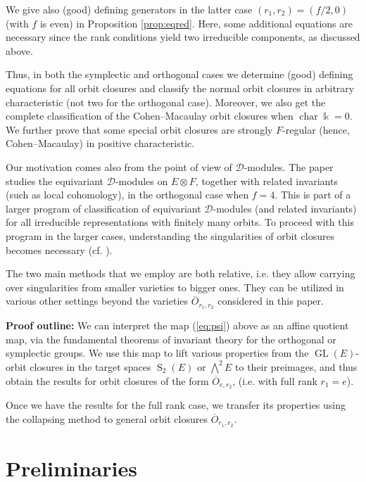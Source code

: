 \documentclass[11pt]{amsart}
\numberwithin{equation}{section}
\theoremstyle{definition}
\DeclareMathOperator{\GL}{GL}
\DeclareMathOperator{\cha}{char}
\newcommand{\op}{\operatorname}
\newcommand{\oo}{\otimes}
\newcommand{\ol}{\overline}
\newcommand{\kk}{\Bbbk}
\begin{document}
We give also (good) defining generators in the latter case $(r_1,r_2) = (f/2, 0)$ (with $f$ is even) in Proposition \ref{prop:eqred}. Here, some additional equations are necessary since the rank conditions yield two irreducible components, as discussed above.

\medskip

Thus, in both the symplectic and orthogonal cases we determine (good) defining equations for all orbit closures and classify the normal orbit closures in arbitrary characteristic (not two for the orthogonal case). Moreover, we also get the complete classification of the Cohen--Macaulay orbit closures when $\cha \kk = 0$. We further prove that some special orbit closures are strongly $F$-regular (hence, Cohen--Macaulay) in positive characteristic.

\smallskip

Our motivation comes also from the point of view of $\mathcal{D}$-modules. The paper \cite{lorper} studies the equivariant $\mathcal{D}$-modules on $E\oo F$, together with related invariants (such as local cohomology), in the orthogonal case when $f=4$. This is part of a larger program of classification of equivariant $\mathcal{D}$-modules (and related invariants) for all irreducible representations with finitely many orbits. To proceed with this program in the larger cases, understanding the singularities of orbit closures becomes necessary (cf. \cite[Section 6]{lorper}).


\medskip

The two main methods that we employ are both relative, i.e. they allow carrying over singularities from smaller varieties to bigger ones. They can be utilized in various other settings beyond the varieties $\ol{O}_{r_1,r_2}$ considered in this paper.

\smallskip

\textbf{Proof outline:} 
We can interpret the map (\ref{eq:psi}) above as an affine quotient map, via the fundamental theorems of invariant theory for the orthogonal or symplectic groups. We use this map to lift various properties from the $\GL(E)$-orbit closures in the target spaces $\op{S}_2(E)$ or $\bigwedge^2 E$ to their preimages, and thus obtain the results for orbit closures of the form $\ol{O}_{e,r_2}$, (i.e. with full rank $r_1=e$). 

Once we have the results for the full rank case, we transfer its properties using the collapsing method \cite{kempf76, me} to general orbit closures $\ol{O}_{r_1, r_2}$.
\section{Preliminaries}
\end{document}
